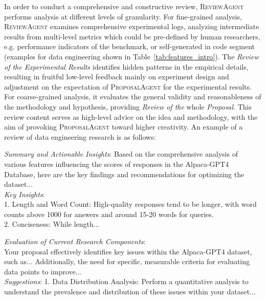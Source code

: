 \documentclass{article} %
\newcommand{\ProposalAgent}{\textsc{ProposalAgent}\xspace}
\newcommand{\ReviewAgent}{\textsc{ReviewAgent}\xspace}
\begin{document}
In order to conduct a comprehensive and constructive review, \ReviewAgent performs analysis at different levels of granularity. For fine-grained analysis, \ReviewAgent examines comprehensive experimental logs, analyzing intermediate results from multi-level metrics which could be pre-defined by human researchers, e.g. performance indicators of the benchmark, or self-generated in code segment (examples for data engineering shown in Table~\ref{tab:features_intro}). The \textit{Review of the Experimental Results} identifies hidden patterns in the empirical details, resulting in fruitful low-level feedback mainly on experiment design and adjustment on the expectation of \ProposalAgent for the experimental results. For coarse-grained analysis, it evaluates the general validity and reasonableness of the methodology and hypothesis, providing \textit{Review of the} whole \textit{Proposal}. This review content serves as high-level advice on the idea and methodology, with the aim of provoking \ProposalAgent toward higher creativity. An example of a review of data engineering research is as follows: 

\vspace{0.5em}

\begin{tcolorbox}[enhanced, breakable, title={An example of the review from \ReviewAgent}, colbacktitle=blue!55!black, coltitle=white, fonttitle=\bfseries, colframe=blue!55!black, colback=white, attach boxed title to top center={yshift=-2mm}, boxed title style = {sharp corners}]
    \begin{tcolorbox}[title={Review of the Experimental Results}, colbacktitle=blue!50!white, fonttitle=\bfseries, colback=blue!10!white, boxrule=0pt]
    \small
    \textit{Summary and Actionable Insights}: Based on the comprehensive analysis of various features influencing the scores of responses in the Alpaca-GPT4 Database, here are the key findings and recommendations for optimizing the dataset... \\
    \textit{Key Insights}: \\
    1. Length and Word Count: High-quality responses tend to be longer, with word counts above 1000 for answers and around 15-20 words for queries. \\
    2. Conciseness: While length...
    \end{tcolorbox}

    \begin{tcolorbox}[title={Review of the Proposal}, colbacktitle=blue!50!white, fonttitle=\bfseries, colback=blue!10!white, boxrule=0pt]
    \small
    \textit{Evaluation of Current Research Components}: \\
    Your proposal effectively identifies key issues within the Alpaca-GPT4 dataset, such as... Additionally, the need for specific, measurable criteria for evaluating data points to improve... \\
    \textit{Suggestions}: 1. Data Distribution Analysis: Perform a quantitative analysis to understand the prevalence and distribution of these issues within your dataset...
    \end{tcolorbox}
\end{tcolorbox}
\end{document}
